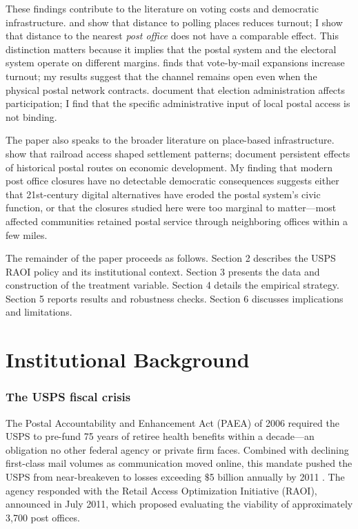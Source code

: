 \documentclass[12pt]{article}
\begin{document}
These findings contribute to the literature on voting costs and democratic infrastructure. \citet{brady2001} and \citet{mcnulty2009} show that distance to polling places reduces turnout; I show that distance to the nearest \emph{post office} does not have a comparable effect. This distinction matters because it implies that the postal system and the electoral system operate on different margins. \citet{thompson2018} finds that vote-by-mail expansions increase turnout; my results suggest that the channel remains open even when the physical postal network contracts. \citet{grimmer2021} document that election administration affects participation; I find that the specific administrative input of local postal access is not binding.

The paper also speaks to the broader literature on place-based infrastructure. \citet{gaudin2024} show that railroad access shaped settlement patterns; \citet{verdier2024} document persistent effects of historical postal routes on economic development. My finding that modern post office closures have no detectable democratic consequences suggests either that 21st-century digital alternatives have eroded the postal system's civic function, or that the closures studied here were too marginal to matter---most affected communities retained postal service through neighboring offices within a few miles.

The remainder of the paper proceeds as follows. Section 2 describes the USPS RAOI policy and its institutional context. Section 3 presents the data and construction of the treatment variable. Section 4 details the empirical strategy. Section 5 reports results and robustness checks. Section 6 discusses implications and limitations.


\section{Institutional Background}

\subsubsection*{The USPS fiscal crisis} The Postal Accountability and Enhancement Act (PAEA) of 2006 required the USPS to pre-fund 75 years of retiree health benefits within a decade---an obligation no other federal agency or private firm faces. Combined with declining first-class mail volumes as communication moved online, this mandate pushed the USPS from near-breakeven to losses exceeding $\$$5 billion annually by 2011 \citep{usps2012}. The agency responded with the Retail Access Optimization Initiative (RAOI), announced in July 2011, which proposed evaluating the viability of approximately 3,700 post offices.
\end{document}
